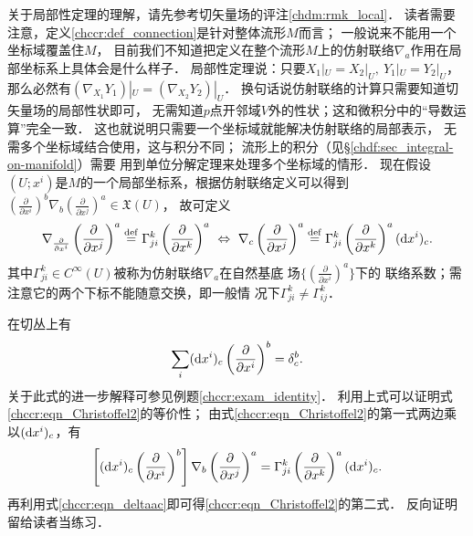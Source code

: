 关于局部性定理的理解，请先参考切矢量场的评注\ref{chdm:rmk_local}．
读者需要注意，定义\ref{chccr:def_connection}是针对整体流形$M$而言；
一般说来不能用一个坐标域覆盖住$M$，
目前我们不知道把定义在整个流形$M$上的仿射联络$\nabla_a$作用在局部坐标系上具体会是什么样子．
{\kaishu 局部性定理}说：只要$X_1|_U =X_2|_U,\ Y_1|_U =Y_2|_U  $，
那么必然有$(\nabla_{X_1} Y_1) |_U=(\nabla_{X_2} Y_2) |_U$．
换句话说仿射联络的计算只需要知道切矢量场的局部性状即可，
无需知道$p$点开邻域$V$外的性状；这和微积分中的“导数运算”完全一致．
这也就说明只需要一个坐标域就能解决仿射联络的局部表示，
无需多个坐标域结合使用，这与积分不同；
流形上的积分（见\S\ref{chdf:sec_integral-on-manifold}）需要
用到单位分解定理来处理多个坐标域的情形．
现在假设$(U;x^i)$是$M$的一个局部坐标系，根据仿射联络定义可以得到
$(\frac{\partial }{\partial x^i}) ^b \nabla_b(\frac{\partial }{\partial x^j}) ^a \in \mathfrak{X}(U)$，
故可定义
\begin{equation}\label{chccr:eqn_Christoffel2}
    \nabla_{\frac{\partial }{\partial x^i}}
    \left(\frac{\partial }{\partial x^j}\right) ^a \overset{\mathrm {def}}{=}
    \Gamma^{k}_{ji} \left(\frac{\partial }{\partial x^k}\right) ^a
      \ \Leftrightarrow \ 
    \nabla_c \left(\frac{\partial }{\partial x^j}\right) ^a \overset{\mathrm {def}}{=}
    \Gamma^{k}_{ji} \left(\frac{\partial }{\partial x^k}\right) ^a ({\rm d} x^i)_c .
\end{equation} %
其中$\Gamma^{k}_{ji} \in C^\infty(U)$被称为仿射联络$\nabla_a$在自然基底
场$\{(\frac{\partial }{\partial x^i}) ^a\}$下的
{\heiti 联络系数}；需注意它的两个下标不能随意交换，即一般情
况下$\Gamma^{k}_{ji}\neq \Gamma^{k}_{ij}$．

在切丛上有
\begin{equation}\label{chccr:eqn_deltaac}
	\sum_i ({\rm d} x^i)_c \left(\frac{\partial }{\partial x^i}\right) ^b = \delta_c^b .
\end{equation}
关于此式的进一步解释可参见例题\ref{chccr:exam_identity}．
利用上式可以证明式\eqref{chccr:eqn_Christoffel2}的等价性；
由式\eqref{chccr:eqn_Christoffel2}的第一式两边乘以$({\rm d} x^i)_c$，有
\begin{equation}
    \left[({\rm d} x^i)_c \left(\frac{\partial }{\partial x^i}\right) ^b\right] \nabla_b
    \left(\frac{\partial }{\partial x^j}\right) ^a =
    \Gamma^{k}_{ji} \left(\frac{\partial }{\partial x^k}\right) ^a ({\rm d} x^i)_c .
\end{equation}
再利用式\eqref{chccr:eqn_deltaac}即可得\eqref{chccr:eqn_Christoffel2}的第二式．
反向证明留给读者当练习．

